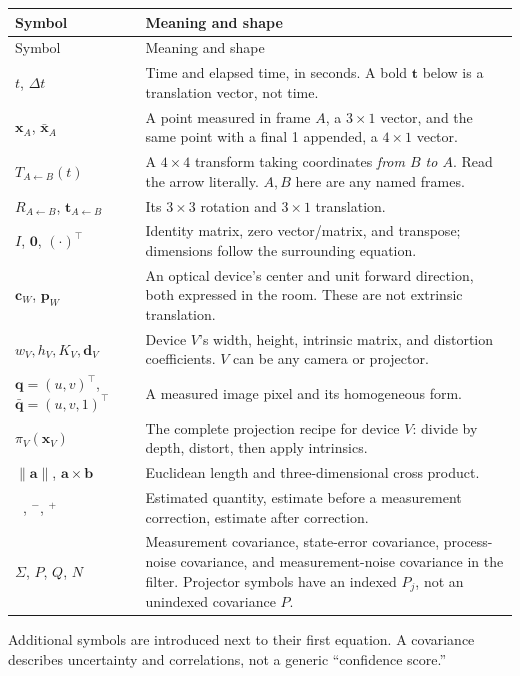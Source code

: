 \documentclass[11pt,a4paper]{article}
\newcommand{\T}[2]{T_{#1\leftarrow #2}}
\newcommand{\Rot}[2]{R_{#1\leftarrow #2}}
\newcommand{\tr}[2]{\bm{t}_{#1\leftarrow #2}}
\newcommand{\pt}[1]{\bm{x}_{#1}}
\newcommand{\hpt}[1]{\bar{\bm{x}}_{#1}}
\begin{document}
\begin{longtable}{@{}L{34mm}L{125mm}@{}}
\toprule Symbol & Meaning and shape\\ \midrule
\endfirsthead
\toprule Symbol & Meaning and shape\\ \midrule \endhead
\bottomrule\endfoot
$t$, $\Delta t$ & Time and elapsed time, in seconds. A bold $\bm{t}$ below
is a translation vector, not time.\\
$\pt{A}$, $\hpt{A}$ & A point measured in frame $A$, a $3\times1$ vector,
and the same point with a final 1 appended, a $4\times1$ vector.\\
$\T{A}{B}(t)$ & A $4\times4$ transform taking coordinates \emph{from $B$ to $A$}.
Read the arrow literally. $A,B$ here are any named frames.\\
$\Rot{A}{B}$, $\tr{A}{B}$ & Its $3\times3$ rotation and $3\times1$ translation.\\
$I$, $\bm{0}$, $(\cdot)^\top$ & Identity matrix, zero vector/matrix,
and transpose; dimensions follow the surrounding equation.\\
$\bm{c}_W$, $\bm{p}_W$ & An optical device's center and unit forward
direction, both expressed in the room. These are not extrinsic translation.\\
$w_V,h_V,K_V,\bm{d}_V$ & Device $V$'s width, height, intrinsic matrix,
and distortion coefficients. $V$ can be any camera or projector.\\
$\bm{q}=(u,v)^\top$, $\bar{\bm{q}}=(u,v,1)^\top$ &
A measured image pixel and its homogeneous form.\\
$\pi_V(\pt{V})$ & The complete projection recipe for device $V$:
divide by depth, distort, then apply intrinsics.\\
$\|\bm{a}\|$, $\bm{a}\times\bm{b}$ &
Euclidean length and three-dimensional cross product.\\
$\hat{\phantom{x}}$, $^-$, $^+$ & Estimated quantity, estimate before
a measurement correction, estimate after correction.\\
$\Sigma$, $P$, $Q$, $N$ & Measurement covariance, state-error covariance,
process-noise covariance, and measurement-noise covariance in the filter.
Projector symbols have an indexed $P_j$, not an unindexed covariance $P$.\\
\end{longtable}
Additional symbols are introduced next to their first equation. A covariance
describes uncertainty and correlations, not a generic ``confidence score.''
\end{document}
